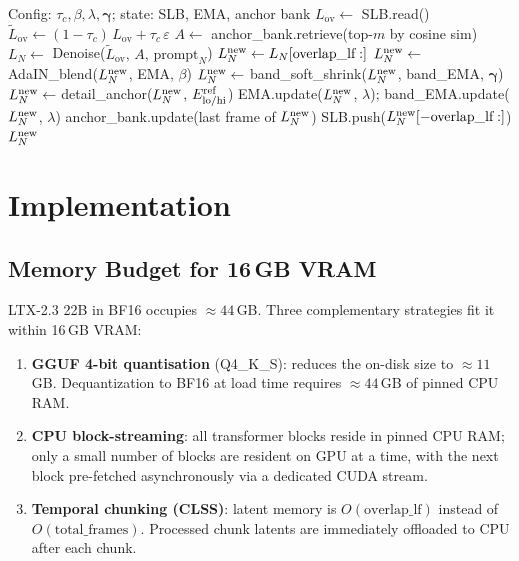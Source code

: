 \documentclass[12pt]{article}
\begin{document}
\begin{algorithm}[H]
\caption{CLSS per-chunk generation}
\label{alg:clss}
\begin{algorithmic}[1]
\Require Config: $\tau_c, \beta, \lambda, \boldsymbol\gamma$; state: SLB, EMA, anchor bank
\State $L_{\text{ov}} \leftarrow$ SLB.read()  
\State $\tilde{L}_{\text{ov}} \leftarrow (1-\tau_c)\,L_{\text{ov}} + \tau_c\,\varepsilon$ 
\State $A \leftarrow$ anchor\_bank.retrieve(top-$m$ by cosine sim) 
\State $L_N \leftarrow$ Denoise($\tilde{L}_{\text{ov}},\, A,\, \text{prompt}_N$)
\State $L_N^{\rm new} \leftarrow L_N[\text{overlap\_lf}:]$ 
\State $L_N^{\rm new} \leftarrow$ AdaIN\_blend($L_N^{\rm new}$, EMA, $\beta$) 
\State $L_N^{\rm new} \leftarrow$ band\_soft\_shrink($L_N^{\rm new}$, band\_EMA, $\boldsymbol\gamma$) 
\State $L_N^{\rm new} \leftarrow$ detail\_anchor($L_N^{\rm new}$, $E^{\rm ref}_{\rm lo/hi}$) 
\State EMA.update($L_N^{\rm new}$, $\lambda$); band\_EMA.update($L_N^{\rm new}$, $\lambda$)
\State anchor\_bank.update(last frame of $L_N^{\rm new}$) 
\State SLB.push($L_N^{\rm new}[-\text{overlap\_lf}:]$)
\State \Return $L_N^{\rm new}$
\end{algorithmic}
\end{algorithm}

\section{Implementation}
\label{sec:impl}

\subsection{Memory Budget for \texorpdfstring{16\,GB}{16 GB} VRAM}
\label{sec:memory}

LTX-2.3 22B in BF16 occupies $\approx44$\,GB.  Three complementary strategies
fit it within 16\,GB VRAM:

\begin{enumerate}[leftmargin=*,noitemsep]
\item \textbf{GGUF 4-bit quantisation} (Q4\_K\_S): reduces the on-disk size
  to $\approx11$\,GB.  Dequantization to BF16 at load time requires
  $\approx44$\,GB of pinned CPU RAM.
\item \textbf{CPU block-streaming}: all transformer blocks reside in pinned
  CPU RAM; only a small number of blocks are resident on GPU at a time, with
  the next block pre-fetched asynchronously via a dedicated CUDA stream.
\item \textbf{Temporal chunking (CLSS)}: latent memory is $O(\text{overlap\_lf})$
  instead of $O(\text{total\_frames})$.  Processed chunk latents are immediately
  offloaded to CPU after each chunk.
\end{enumerate}
\end{document}
